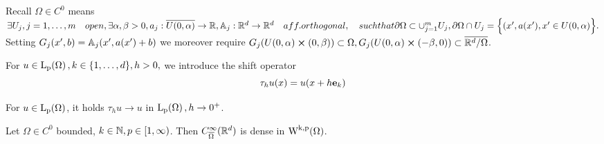 \documentclass{article}
\begin{document}
Recall $\Omega \in C^{0}$ means $\exists U_j, j=1, \dots, m \quad{open}, \exists \alpha, \beta >0, a_j: \overline{U(0,\alpha)} \to {\mathbb R}, \mathbb{A}_j: {\mathbb R}^d \to {\mathbb R}^d \quad{aff. orthogonal}, \quad{such that} \partial \Omega \subset \cup_{j=1}^m U_j, \partial \Omega \cap U_j = \Big\{ (x',a(x'), x' \in U(0,\alpha)\Big\}.$ Setting $G_j(x',b) = \mathbb{A}_j(x',a(x')+b)$ we moreover require $G_j(U(0,\alpha) \cross (0,\beta)) \subset \Omega, G_j(U(0,\alpha) \cross (-\beta,0)) \subset \overline{{\mathbb R}^d / \Omega}$. 

\begin{definition}
	For $u \in \LpSet{\Omega}, k \in \{1,\dots,d\}, h >0, $ we introduce the shift operator
	\begin{equation*}
		\tau_h u(x)=u(x+h \vb{e}_k)
	\end{equation*}
\end{definition}

\begin{lemma}
    For $u \in \LpSet{\Omega}$, it holds $\tau_h u \to u$ in $\LpSet{\Omega}, h\to 0^+$.
\end{lemma}

\begin{theorem}
    Let $\Omega \in C^0$ bounded, $k \in {\mathbb N}, p \in [1,\infty)$. Then $C^\infty_{\overline{\Omega}}({\mathbb R}^d)$ is dense in $\WkpSet{\Omega}$.


\end{theorem}
\end{document}
